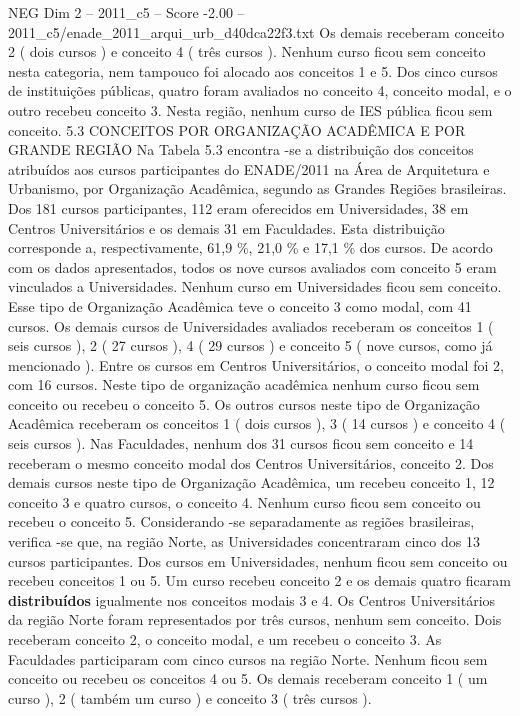\begin{textsample}{NEG Dim 2 – 2011\_c5 – Score -2.00 – 2011\_c5/enade\_2011\_arqui\_urb\_d40dca22f3.txt}
Os demais receberam conceito 2 ( dois cursos ) e conceito 4 ( três cursos ).
Nenhum curso ficou sem conceito nesta categoria, nem tampouco foi alocado aos conceitos 1 e 5.
Dos cinco cursos de instituições públicas, quatro foram avaliados no conceito 4, conceito modal, e o outro recebeu conceito 3.
Nesta região, nenhum curso de IES pública ficou sem conceito. 5.3 CONCEITOS POR ORGANIZAÇÃO ACADÊMICA E POR GRANDE REGIÃO Na Tabela 5.3 encontra -se a distribuição dos conceitos atribuídos aos cursos participantes do ENADE/2011 na Área de Arquitetura e Urbanismo, por Organização Acadêmica, segundo as Grandes Regiões brasileiras.
Dos 181 cursos participantes, 112 eram oferecidos em Universidades, 38 em Centros Universitários e os demais 31 em Faculdades.
Esta distribuição corresponde a, respectivamente, 61,9 \%, 21,0 \% e 17,1 \% dos cursos.
De acordo com os dados apresentados, todos os nove cursos avaliados com conceito 5 eram vinculados a Universidades.
Nenhum curso em Universidades ficou sem conceito.
Esse tipo de Organização Acadêmica teve o conceito 3 como modal, com 41 cursos.
Os demais cursos de Universidades avaliados receberam os conceitos 1 ( seis cursos ), 2 ( 27 cursos ), 4 ( 29 cursos ) e conceito 5 ( nove cursos, como já mencionado ).
Entre os cursos em Centros Universitários, o conceito modal foi 2, com 16 cursos.
Neste tipo de organização acadêmica nenhum curso ficou sem conceito ou recebeu o conceito 5.
Os outros cursos neste tipo de Organização Acadêmica receberam os conceitos 1 ( dois cursos ), 3 ( 14 cursos ) e conceito 4 ( seis cursos ).
Nas Faculdades, nenhum dos 31 cursos ficou sem conceito e 14 receberam o mesmo conceito modal dos Centros Universitários, conceito 2.
Dos demais cursos neste tipo de Organização Acadêmica, um recebeu conceito 1, 12 conceito 3 e quatro cursos, o conceito 4.
Nenhum curso ficou sem conceito ou recebeu o conceito 5.
Considerando -se separadamente as regiões brasileiras, verifica -se que, na região Norte, as Universidades concentraram cinco dos 13 cursos participantes.
Dos cursos em Universidades, nenhum ficou sem conceito ou recebeu conceitos 1 ou 5.
Um curso recebeu conceito 2 e os demais quatro ficaram \textbf{distribuídos} igualmente nos conceitos modais 3 e 4.
Os Centros Universitários da região Norte foram representados por três cursos, nenhum sem conceito.
Dois receberam conceito 2, o conceito modal, e um recebeu o conceito 3.
As Faculdades participaram com cinco cursos na região Norte.
Nenhum ficou sem conceito ou recebeu os conceitos 4 ou 5.
Os demais receberam conceito 1 ( um curso ), 2 ( também um curso ) e conceito 3 ( três cursos ).

\end{textsample}
